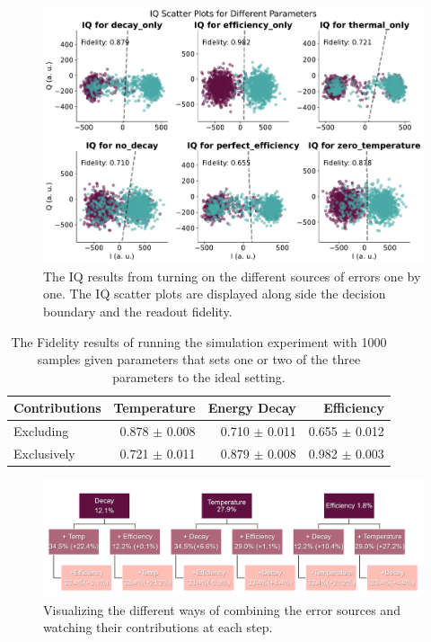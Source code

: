 \begin{figure}[h]
    \centering
    \includegraphics[]{Simulations/budgets/figures/iq_scatter_budgetting_on_off.pdf}
    \caption{The IQ results from turning on the different sources of errors one by one. The IQ scatter plots are displayed along side the decision boundary and the readout fidelity.}
    \label{fig:on_off_IQ_scatter_combinations}
\end{figure}

\begin{table}[h]
\centering
\caption{The Fidelity results of running the simulation experiment with 1000 samples given parameters that sets one or two of the three parameters to the ideal setting.}
\begin{tabular}{l|rrr}
\hline
\textbf{Contributions}        & Temperature         & Energy Decay   & Efficiency  \\ \hline
Excluding                     &  0.878 $\pm$ 0.008  &  0.710 $\pm$  0.011  &  0.655 $\pm$ 0.012\\
Exclusively                   &  0.721 $\pm$ 0.011  &  0.879 $\pm$  0.008  &  0.982 $\pm$ 0.003
\end{tabular}
\label{tab:readout_infidelity_contribution_estimation}
\end{table}



\begin{figure}
    \centering
    \includegraphics{Figs/Results/combination_tree.png}
    \caption{Visualizing the different ways of combining the error sources and watching their contributions at each step.}
    \label{fig:combination_tree_budget}
\end{figure}


